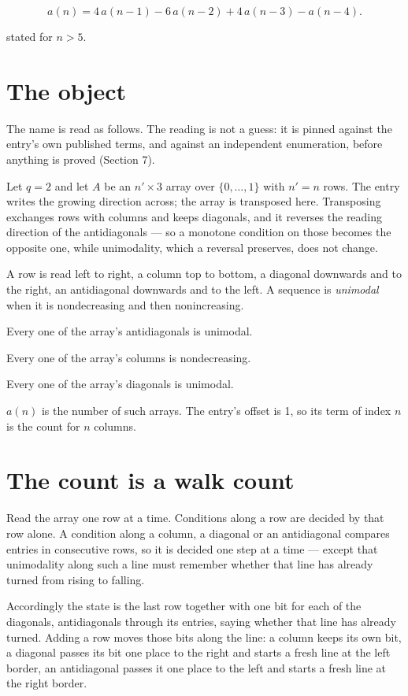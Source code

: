 \documentclass[11pt]{article}
\theoremstyle{definition}
\begin{document}
\[a(n) = 4\,a(n-1) - 6\,a(n-2) + 4\,a(n-3) - a(n-4).\]

stated for $n > 5$.

\section{The object}

The name is read as follows. The reading is not a guess: it is pinned against the entry's own published terms, and against an independent enumeration, before anything is proved (Section 7).

Let $q = 2$ and let $A$ be an $n' \times 3$ array over $\{0,\dots,1\}$ with $n' = n$ rows. The entry writes the growing direction across; the array is transposed here. Transposing exchanges rows with columns and keeps diagonals, and it reverses the reading direction of the antidiagonals --- so a monotone condition on those becomes the opposite one, while unimodality, which a reversal preserves, does not change.

A row is read left to right, a column top to bottom, a diagonal downwards and to the right, an antidiagonal downwards and to the left. A sequence is {\itshape unimodal} when it is nondecreasing and then nonincreasing.

Every one of the array's antidiagonals is unimodal.

Every one of the array's columns is nondecreasing.

Every one of the array's diagonals is unimodal.

$a(n)$ is the number of such arrays. The entry's offset is 1, so its term of index $n$ is the count for $n$ columns.

\section{The count is a walk count}

Read the array one row at a time. Conditions along a row are decided by that row alone. A condition along a column, a diagonal or an antidiagonal compares entries in consecutive rows, so it is decided one step at a time --- except that unimodality along such a line must remember whether that line has already turned from rising to falling.

Accordingly the state is the last row together with one bit for each of the diagonals, antidiagonals through its entries, saying whether that line has already turned. Adding a row moves those bits along the line: a column keeps its own bit, a diagonal passes its bit one place to the right and starts a fresh line at the left border, an antidiagonal passes it one place to the left and starts a fresh line at the right border.
\end{document}
